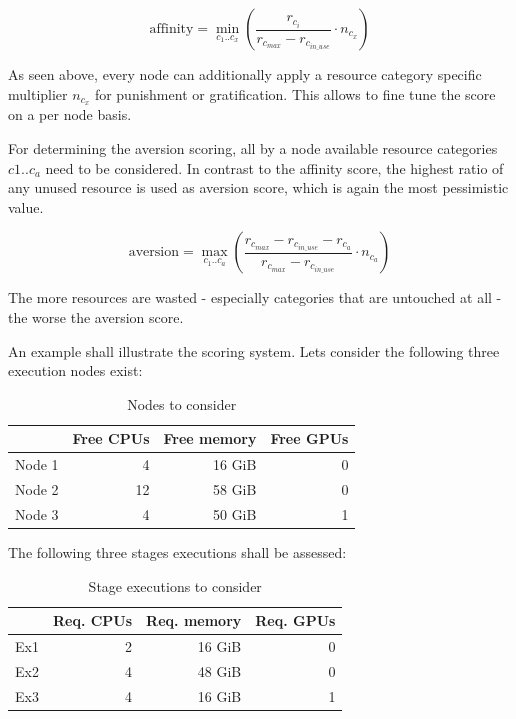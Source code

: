 \begin{equation}
	\label{election:eq:affinity}
	\text{affinity} = \min_{c_1 .. c_x} \left( \frac{r_{c_i}}{r_{c_{max}} - r_{c_{in\_use}}} \cdot n_{c_x} \right)
\end{equation}

As seen above, every node can additionally apply a resource category specific multiplier $n_{c_x}$ for punishment or gratification.
This allows to fine tune the score on a per node basis.

For determining the aversion scoring, all by a node available resource categories $c1 .. c_a$ need to be considered.
In contrast to the affinity score, the highest ratio of any unused resource is used as aversion score, which is again the most pessimistic value.

\begin{equation}
	\label{election:eq:aversion}
	\text{aversion} = \max_{c_1 .. c_a} \left( \frac{r_{c_{max}} - r_{c_{in\_use}} - r_{c_a}}{r_{c_{max}}  - r_{c_{in\_use}}} \cdot n_{c_a} \right)
\end{equation}

The more resources are wasted - especially categories that are untouched at all - the worse the aversion score.

An example shall illustrate the scoring system.
Lets consider the following three execution nodes exist:

\begin{table}[H]
	\centering
	\begin{tabular}{l|r|r|r}
		 & Free CPUs & Free memory & Free GPUs \\
		 \hline
		 Node 1 & 4  	& 16 GiB & 0 \\
		 Node 2 & 12 	& 58 GiB & 0 \\
		 Node 3 & 4 	& 50 GiB & 1 \\
	\end{tabular}
	\caption{Nodes to consider}
\end{table}

The following three stages executions shall be assessed:

\begin{table}[H]
	\centering
	\begin{tabular}{l|r|r|r}
		& Req. CPUs & Req. memory & Req. GPUs \\
		\hline
		Ex1 & 2 & 16 GiB & 0 \\
		Ex2 & 4 & 48 GiB & 0 \\
		Ex3 & 4 & 16 GiB & 1 \\
	\end{tabular}
	\caption{Stage executions to consider}
\end{table}

